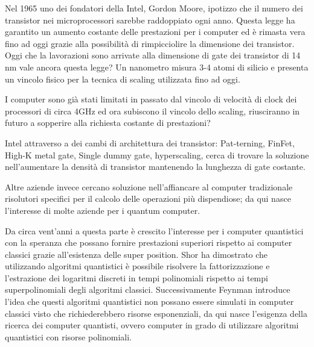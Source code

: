 Nel 1965 uno dei fondatori della Intel, Gordon Moore, ipotizzo che il numero dei transistor nei microprocessori sarebbe raddoppiato ogni anno. Questa legge ha garantito un aumento costante delle prestazioni per i computer ed è rimasta vera fino ad oggi grazie alla possibilità di rimpicciolire la dimensione dei transistor. Oggi che la lavorazioni sono arrivate alla dimensione di gate dei transistor di 14 nm vale ancora questa legge? Un nanometro misura 3-4 atomi di silicio e presenta un vincolo fisico per la tecnica di scaling utilizzata fino ad oggi.

I computer sono già stati limitati in passato dal vincolo di velocità di clock dei processori di circa 4GHz ed ora subiscono il vincolo dello scaling, riusciranno in futuro a sopperire alla richiesta costante di prestazioni?

Intel attraverso a dei cambi di architettura dei transistor: Pat-terning, FinFet, High-K metal gate, Single dummy gate, hyperscaling, cerca di trovare la soluzione nell'aumentare la densità di transistor mantenendo la lunghezza di gate costante.

Altre aziende invece cercano soluzione nell'affiancare al computer tradizionale risolutori specifici per il calcolo delle operazioni più dispendiose; da qui nasce l'interesse di molte aziende per i quantum computer.

Da circa vent'anni a questa parte è crescito l'interesse per i computer quantistici con la speranza che possano fornire prestazioni superiori rispetto ai computer classici grazie all'esistenza delle super position. Shor ha dimostrato che utilizzando algoritmi quantistici è possibile risolvere la fattorizzazione e l'estrazione dei logaritmi discreti in tempi polinomiali rispetto ai tempi superpolinomiali degli algoritmi classici. Successivamente Feynman introduce l'idea che questi algoritmi quantistici non possano essere simulati in computer classici visto che richiederebbero risorse esponenziali, da qui nasce l'esigenza della ricerca dei computer quantisti, ovvero computer in grado di utilizzare algoritmi quantistici con risorse polinomiali.
